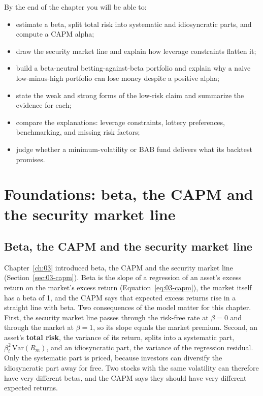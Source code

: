 By the end of the chapter you will be able to:

\begin{itemize}
  \item estimate a beta, split total risk into systematic and idiosyncratic parts, and compute a CAPM alpha;
  \item draw the security market line and explain how leverage constraints flatten it;
  \item build a beta-neutral betting-against-beta portfolio and explain why a naive low-minus-high portfolio can lose money despite a positive alpha;
  \item state the weak and strong forms of the low-risk claim and summarize the evidence for each;
  \item compare the explanations: leverage constraints, lottery preferences, benchmarking, and missing risk factors;
  \item judge whether a minimum-volatility or BAB fund delivers what its backtest promises.
\end{itemize}

\section{Foundations: beta, the CAPM and the security market line}
\label{sec:05-foundations}

\subsection{Beta, the CAPM and the security market line}

Chapter~\ref{ch:03} introduced beta, the CAPM and the security market line (Section~\ref{sec:03-capm}). Beta is the slope of a regression of an asset's excess return on the market's excess return (Equation~\eqref{eq:03-capm}), the market itself has a beta of 1, and the CAPM says that expected excess returns rise in a straight line with beta. Two consequences of the model matter for this chapter. First, the security market line passes through the risk-free rate at $\beta = 0$ and through the market at $\beta = 1$, so its slope equals the market premium. Second, an asset's \textbf{total risk}, the variance of its return, splits into a systematic part, $\beta_i^2\,\mathrm{Var}(R_m)$, and an idiosyncratic part, the variance of the regression residual. Only the systematic part is priced, because investors can diversify the idiosyncratic part away for free. Two stocks with the same volatility can therefore have very different betas, and the CAPM says they should have very different expected returns.

